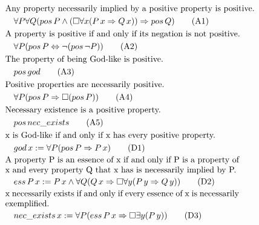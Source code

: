\documentclass{llncs}
\begin{document}
\begin{align}
& \text{Any property necessarily implied by a positive property is positive.} \notag \\
& \quad \forall P \forall Q (pos\,P \wedge (\Box \forall x (P\,x \Rightarrow Q\,x)) \Rightarrow pos\,Q) \tag{A1} \\
& \text{A property is positive if and only if its negation is not positive.} \notag \\
& \quad \forall P (pos\,P \Leftrightarrow \neg (pos\,\neg P)) \tag{A2} \\
& \text{The property of being God-like is positive.} \notag \\
& \quad pos\,god \tag{A3} \\
& \text{Positive properties are necessarily positive.} \notag \\
& \quad \forall P (pos\,P \Rightarrow \Box (pos\,P))\tag{A4} \\
& \text{Necessary existence is a positive property.} \notag \\
& \quad pos\,nec\_exists \tag{A5} \\
& \text{x is God-like if and only if x has every positive property.} \notag \\
& \quad god\,x := \forall P (pos\,P \Rightarrow P\,x) \tag{D1} \\ 
& \parbox[c][2em][c]{0.8\textwidth}{A property P is an essence of x if and only if P is a property of x and every property Q that x has is necessarily implied by P.}\notag \\
& \quad ess\,P\,x := P\,x \wedge \forall Q (Q\,x \Rightarrow \Box \forall y (P\,y \Rightarrow Q\,y)) \tag{D2} \\
& \parbox[c][2em][c]{0.8\textwidth}{x necessarily exists if and only if every essence of x is necessarily exemplified.} \notag \\
& \quad nec\_exists\,x := \forall P (ess\,P\,x \Rightarrow \Box \exists y (P\,y)) \tag{D3} 
\end{align}
\end{document}
